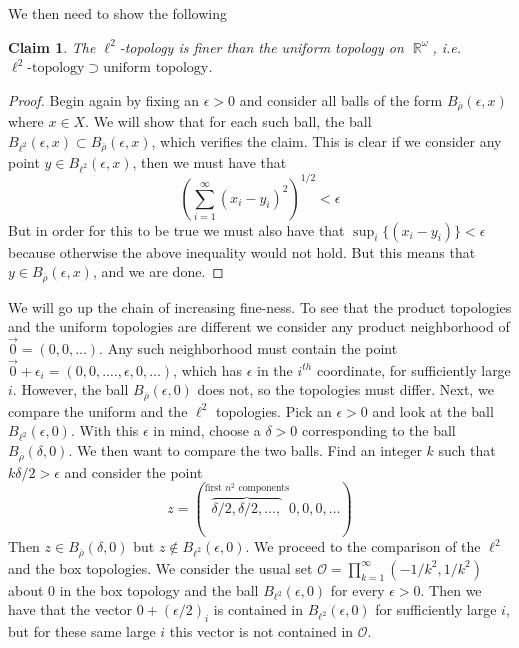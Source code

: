 \documentclass{article}
\DeclareMathOperator{\R}{\mathbb{R}}
\newcommand{\problempart}[1]{\noindent{\textbf{(#1)}}}
\newtheorem*{claim}{Claim}
\begin{document}
We then need to show the following\\
\begin{claim}
The $\ell^2$-topology is finer than the uniform topology on $\R^\omega$, i.e. $\ell^2\text{-topology} \supset \text{uniform topology} $.
\end{claim}
\begin{proof}
Begin again by fixing an $\epsilon > 0$ and consider all balls of the form $B_{\overline{\rho}}(\epsilon, x)$ where $x \in X$. We will show that for each such ball, the ball $B_{\ell^2}(\epsilon, x) \subset B_{\overline{\rho}}(\epsilon, x)$, which verifies the claim. This is clear if we consider any point $y \in B_{\ell^2}(\epsilon, x)$, then we must have that 
\[
\left(\sum_{i=1}^\infty (x_i - y_i)^2\right)^{1/2} < \epsilon
\]
But in order for this to be true we must also have that $\sup_i \{(x_i - y_i)\} < \epsilon$ because otherwise the above inequality would not hold. But this means that $y \in B_{\overline{\rho}}(\epsilon, x)$, and we are done. 
\end{proof}
\problempart{b} We will go up the chain of increasing fine-ness. To see that the product topologies and the uniform topologies are different we consider any product neighborhood of $\vec{0} = (0, 0, \ldots)$. Any  such neighborhood must contain the point $\vec{0} + \epsilon_i = (0,0,.\ldots, \epsilon, 0,\ldots)$, which has $\epsilon$ in the $i^{th}$ coordinate, for sufficiently large $i$. However, the ball $B_{\overline{\rho}}(\epsilon, 0)$ does not, so the topologies must differ. Next, we compare the uniform and the $\ell^2$ topologies. Pick an $\epsilon > 0$ and look at the ball $B_{\ell^2}(\epsilon, 0)$. With this $\epsilon$ in mind, choose a $\delta > 0$ corresponding to the ball $B_{\overline{\rho}}(\delta, 0)$. We then want to compare the two balls. Find an integer $k$ such that $k\delta/2 > \epsilon$ and consider the point 
\[
z = (\overbrace{\delta/2, \delta/2, \ldots,}^{\text{first }n^2\text{ components}}0,0,0,\ldots)
\]
Then $z \in B_{\overline{\rho}}(\delta, 0)$ but $z \not\in B_{\ell^2}(\epsilon, 0)$. We proceed to the comparison of the $\ell^2$ and the box topologies. We consider the usual set $\mathcal{O} = \prod_{k=1}^\infty (-1/k^2, 1/k^2)$ about 0 in the box topology and the ball $B_{\ell^2}(\epsilon, 0)$ for every $\epsilon > 0$. Then we have that the vector $0 + (\epsilon/2)_i$ is contained in $B_{\ell^2}(\epsilon, 0)$ for sufficiently large $i$, but for these same large $i$ this vector is not contained in $\mathcal{O}$. 
\end{document}
